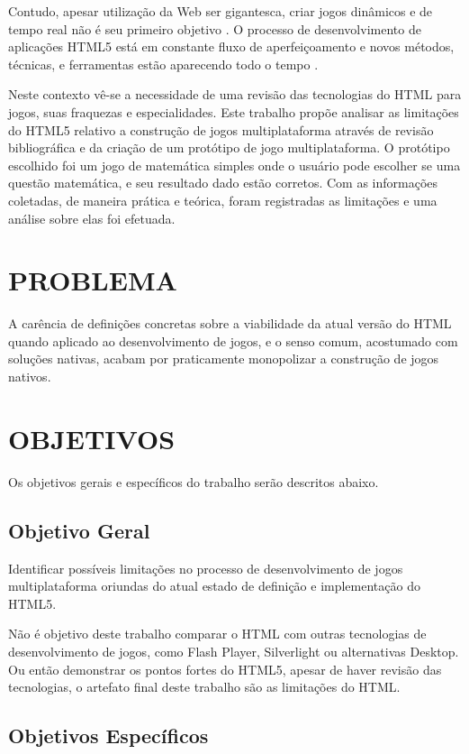 Contudo, apesar utilização da Web ser gigantesca, criar
jogos dinâmicos e de tempo real não é seu primeiro objetivo
\autocite{html5mostwanted}. O processo de desenvolvimento de
aplicações HTML5 está em constante fluxo de aperfeiçoamento e novos
métodos, técnicas, e ferramentas estão aparecendo todo o tempo
\autocite{crossPlatformMobileGame}.

Neste contexto vê-se a necessidade de uma revisão das tecnologias do
HTML para jogos, suas fraquezas e especialidades. Este trabalho propõe
analisar as limitações do HTML5 relativo a construção de jogos
multiplataforma através de revisão bibliográfica e da criação de um
protótipo de jogo multiplataforma. O protótipo escolhido foi um jogo
de matemática simples onde o usuário pode escolher se uma questão
matemática, e seu resultado dado estão corretos. Com as informações
coletadas, de maneira prática e teórica, foram registradas as limitações
e uma análise sobre elas foi efetuada.

\section{PROBLEMA}
A carência de definições concretas sobre a viabilidade da atual
versão do HTML quando aplicado ao desenvolvimento de jogos, e o senso
comum, acostumado com soluções nativas, acabam por praticamente
monopolizar a construção de jogos nativos.
\section{OBJETIVOS}

Os objetivos gerais e específicos do trabalho serão descritos abaixo.

\subsection{Objetivo Geral}

Identificar possíveis limitações no processo de desenvolvimento
de jogos multiplataforma oriundas do atual estado de definição e
implementação do HTML5.

Não é objetivo deste trabalho comparar o HTML com outras tecnologias
de desenvolvimento de jogos, como Flash Player, Silverlight ou
alternativas Desktop. Ou então demonstrar os pontos fortes do HTML5,
apesar de haver revisão das tecnologias, o artefato final deste
trabalho são as limitações do HTML.

\subsection{Objetivos Específicos}

